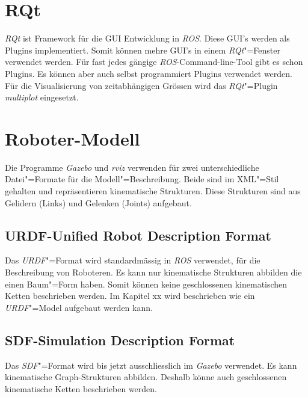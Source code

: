 

\section{RQt}
\textit{RQt} ist Framework für die GUI Entwicklung in \textit{ROS}.
Diese GUI's werden als Plugins implementiert.
Somit können mehre GUI's in einem \textit{RQt}"=Fenster verwendet werden.
Für fast jedes gängige \textit{ROS}-Command-line-Tool gibt es schon Plugins. %
Es können aber auch selbst programmiert Plugins verwendet werden. 
Für die Visualisierung von zeitabhängigen Grössen wird das \textit{RQt}"=Plugin \textit{multiplot} eingesetzt. %



\section{Roboter-Modell} %

Die Programme \textit{Gazebo} und \textit{rviz} verwenden für zwei unterschiedliche Datei"=Formate für die Modell"=Beschreibung.
Beide sind im XML"=Stil gehalten und repräsentieren kinematische Strukturen.
Diese Strukturen sind aus Gelidern (Links) und Gelenken (Joints) aufgebaut.

\subsection{URDF-Unified Robot Description Format}
Das \textit{URDF}"=Format wird standardmässig in \textit{ROS} verwendet, für die Beschreibung von Roboteren.
Es kann nur kinematische Strukturen abbilden die einen Baum"=Form haben.
Somit können keine geschlossenen kinematischen Ketten beschrieben werden.
Im Kapitel xx wird beschrieben wie ein \textit{URDF}"=Model aufgebaut werden kann. %

\subsection{SDF-Simulation Description Format}
Das \textit{SDF}"=Format wird bis jetzt ausschliesslich im \textit{Gazebo} verwendet.
Es kann kinematische Graph-Strukturen abbilden.
Deshalb könne auch geschlossenen kinematische Ketten beschrieben werden.

